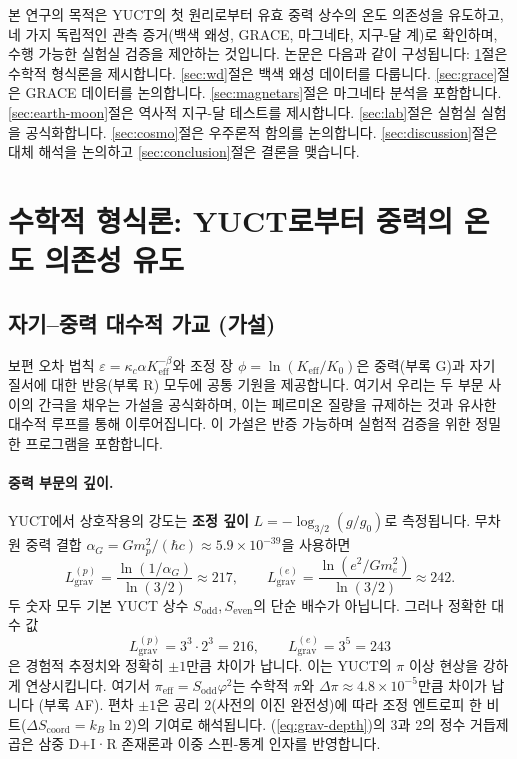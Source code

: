 \documentclass[11pt,a4paper]{article}
\newcommand{\Keff}{K_{\mathrm{eff}}}
\newcommand{\kappac}{\kappa_c}
\begin{document}
	본 연구의 목적은 YUCT의 첫 원리로부터 유효 중력 상수의 온도 의존성을 유도하고, 네 가지 독립적인 관측 증거(백색 왜성, GRACE, 마그네타, 지구-달 계)로 확인하며, 수행 가능한 실험실 검증을 제안하는 것입니다. 논문은 다음과 같이 구성됩니다: \ref{sec:math}절은 수학적 형식론을 제시합니다. \ref{sec:wd}절은 백색 왜성 데이터를 다룹니다. \ref{sec:grace}절은 GRACE 데이터를 논의합니다. \ref{sec:magnetars}절은 마그네타 분석을 포함합니다. \ref{sec:earth-moon}절은 역사적 지구-달 테스트를 제시합니다. \ref{sec:lab}절은 실험실 실험을 공식화합니다. \ref{sec:cosmo}절은 우주론적 함의를 논의합니다. \ref{sec:discussion}절은 대체 해석을 논의하고 \ref{sec:conclusion}절은 결론을 맺습니다.
	
	\section{수학적 형식론: YUCT로부터 중력의 온도 의존성 유도}
	\label{sec:math}
	
	\subsection{자기–중력 대수적 가교 (가설)}
	\label{subsec:magnetism-bridge}
	
	보편 오차 법칙 $\varepsilon = \kappac \alpha \Keff^{-\beta}$와 조정 장 $\phi = \ln(\Keff/K_0)$은 중력(부록 G)과 자기 질서에 대한 반응(부록 R) 모두에 공통 기원을 제공합니다.  
	여기서 우리는 두 부문 사이의 간극을 채우는 가설을 공식화하며, 이는 페르미온 질량을 규제하는 것과 유사한 대수적 루프를 통해 이루어집니다.  
	이 가설은 반증 가능하며 실험적 검증을 위한 정밀한 프로그램을 포함합니다.
	
	\paragraph{중력 부문의 깊이.}
	YUCT에서 상호작용의 강도는 \textbf{조정 깊이} $L = -\log_{3/2}(g/g_0)$로 측정됩니다. 무차원 중력 결합 $\alpha_G = G m_p^2/(\hbar c) \approx 5.9\times10^{-39}$을 사용하면
	\begin{equation}
		L_{\mathrm{grav}}^{(p)} = \frac{\ln(1/\alpha_G)}{\ln(3/2)} \approx 217,
		\qquad
		L_{\mathrm{grav}}^{(e)} = \frac{\ln(e^2/G m_e^2)}{\ln(3/2)} \approx 242.
	\end{equation}
	두 숫자 모두 기본 YUCT 상수 $S_{\mathrm{odd}}, S_{\mathrm{even}}$의 단순 배수가 아닙니다. 그러나 정확한 대수 값
	\begin{equation}
		\boxed{L_{\mathrm{grav}}^{(p)} = 3^3 \cdot 2^3 = 216},
		\qquad
		\boxed{L_{\mathrm{grav}}^{(e)} = 3^5 = 243}
		\label{eq:grav-depth}
	\end{equation}
	은 경험적 추정치와 정확히 $\pm1$만큼 차이가 납니다.  
	이는 YUCT의 $\pi$ 이상 현상을 강하게 연상시킵니다. 여기서 $\pi_{\mathrm{eff}} = S_{\mathrm{odd}}\varphi^2$는 수학적 $\pi$와 $\Delta\pi \approx 4.8\times10^{-5}$만큼 차이가 납니다 (부록 AF).  
	편차 $\pm1$은 공리 2(사전의 이진 완전성)에 따라 조정 엔트로피 한 비트($\Delta S_{\mathrm{coord}} = k_B \ln 2$)의 기여로 해석됩니다. (\ref{eq:grav-depth})의 3과 2의 정수 거듭제곱은 삼중 D+I·R 존재론과 이중 스핀-통계 인자를 반영합니다.
	
\end{document}
